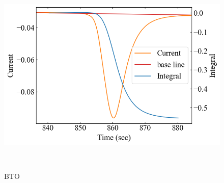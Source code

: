 \documentclass[9pt,dvipdfmx,a4paper]{jsarticle}
\begin{document}
\begin{figure}[hbt]
\begin{minipage}[t]{0.245\columnwidth}
    \end{minipage}
    \hfill
    \begin{minipage}[t]{0.245\columnwidth}
        \centering
        \includegraphics[width = \columnwidth]{appendix/BTO-dSdt-cool.png}
    \end{minipage}\\
    \caption{BTO}


\end{figure}
\end{document}
